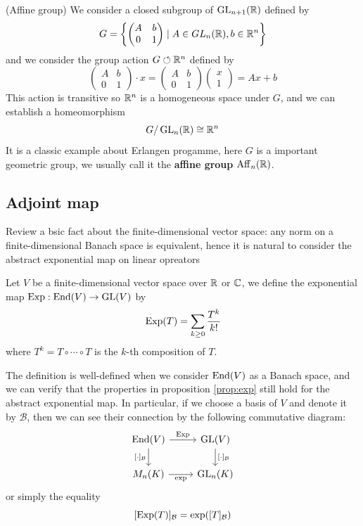 \begin{example} (Affine group)
    We consider a closed subgroup of \(\operatorname{GL}_{n+1}(\mathbb{R})\) defined by
\[G = \left\{\begin{pmatrix}A & b \\ 0 & 1\end{pmatrix} \mid A \in GL_n(\mathbb{R}), b \in \mathbb{R}^n\right\}\]
and we consider the group action \(G \circlearrowleft \mathbb{R}^n\) defined by
\[\begin{pmatrix}
    A & b\\
    0 & 1
\end{pmatrix}\cdot x = \begin{pmatrix}
    A & b\\
    0 & 1
\end{pmatrix}\begin{pmatrix}
    x\\
    1
\end{pmatrix} = Ax +b\]
This action is transitive so \(\mathbb{R}^n\) is a homogeneous space under \(G\), and we can establish a homeomorphism
\[G/\operatorname{GL}_n(\mathbb{R}) \cong \mathbb{R}^n\]
It is a classic example about Erlangen progamme, here \(G\) is a important geometric group, we usually call it the \textbf{affine group} \(\mathrm{Aff}_n(\mathbb{R})\).
\end{example}


\subsection{Adjoint map}
Review a bsic fact about the finite-dimensional vector space: any norm on a finite-dimensional Banach space is equivalent, hence it is natural to consider the abstract exponential map on linear opreators

\begin{definition}
    Let \(V\) be a finite-dimensional vector space over \(\mathbb{R}\) or \(\mathbb{C}\), we define the exponential map \(\operatorname{Exp}: \operatorname{End}(V) \to \operatorname{GL}(V)\) by
    \[\operatorname{Exp}(T)  = \sum_{k \geq 0} \frac{T^k}{k!}\]
    where \(T^k = T\circ \cdots \circ T\) is the \(k\)-th composition of \(T\).
\end{definition}

The definition is well-defined when we consider \(\operatorname{End}(V)\) as a Banach space, and we can verify that the properties in proposition \ref{prop:exp} still hold for the abstract exponential map. In particular, if we choose a basis of \(V\) and denote it by \(\mathcal{B}\), then we can see their connection by the following commutative diagram:
\[\begin{tikzcd}
	{\mathrm{End}(V)} & {\mathrm{GL}(V)} \\
	{M_n(K)} & {\mathrm{GL}_n(K)}
	\arrow["{\mathrm{Exp}}", from=1-1, to=1-2]
	\arrow["{[\cdot]_{\mathcal{B}}}"', from=1-1, to=2-1]
	\arrow["{[\cdot]_{\mathcal{B}}}", from=1-2, to=2-2]
	\arrow["\exp"', from=2-1, to=2-2]
\end{tikzcd}\]
or simply the equality \[[\operatorname{Exp}(T)]_{\mathcal{B}} = \exp([T]_{\mathcal{B}})\]


